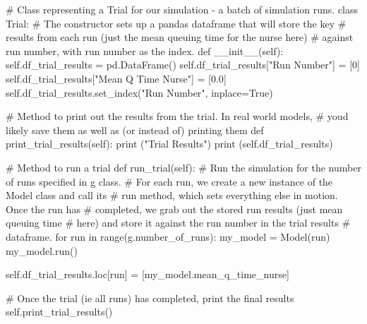 \documentclass[
  letterpaper,
  DIV=11,
  numbers=noendperiod]{scrreprt}
\newenvironment{Shaded}{}{}
\newcommand{\BuiltInTok}[1]{\textcolor[rgb]{0.84,0.23,0.29}{#1}}
\newcommand{\CommentTok}[1]{\textcolor[rgb]{0.42,0.45,0.49}{#1}}
\newcommand{\ControlFlowTok}[1]{\textcolor[rgb]{0.84,0.23,0.29}{#1}}
\newcommand{\DecValTok}[1]{\textcolor[rgb]{0.00,0.36,0.77}{#1}}
\newcommand{\FloatTok}[1]{\textcolor[rgb]{0.00,0.36,0.77}{#1}}
\newcommand{\FunctionTok}[1]{\textcolor[rgb]{0.44,0.26,0.76}{#1}}
\newcommand{\KeywordTok}[1]{\textcolor[rgb]{0.84,0.23,0.29}{#1}}
\newcommand{\NormalTok}[1]{\textcolor[rgb]{0.14,0.16,0.18}{#1}}
\newcommand{\OperatorTok}[1]{\textcolor[rgb]{0.14,0.16,0.18}{#1}}
\newcommand{\StringTok}[1]{\textcolor[rgb]{0.01,0.18,0.38}{#1}}
\newcommand{\VariableTok}[1]{\textcolor[rgb]{0.89,0.38,0.04}{#1}}
\begin{document}
\begin{Shaded}
\begin{Highlighting}[]
\CommentTok{\# Class representing a Trial for our simulation {-} a batch of simulation runs.}
\KeywordTok{class}\NormalTok{ Trial:}
    \CommentTok{\# The constructor sets up a pandas dataframe that will store the key}
    \CommentTok{\# results from each run (just the mean queuing time for the nurse here)}
    \CommentTok{\# against run number, with run number as the index.}
    \KeywordTok{def}  \FunctionTok{\_\_init\_\_}\NormalTok{(}\VariableTok{self}\NormalTok{):}
        \VariableTok{self}\NormalTok{.df\_trial\_results }\OperatorTok{=}\NormalTok{ pd.DataFrame()}
        \VariableTok{self}\NormalTok{.df\_trial\_results[}\StringTok{"Run Number"}\NormalTok{] }\OperatorTok{=}\NormalTok{ [}\DecValTok{0}\NormalTok{]}
        \VariableTok{self}\NormalTok{.df\_trial\_results[}\StringTok{"Mean Q Time Nurse"}\NormalTok{] }\OperatorTok{=}\NormalTok{ [}\FloatTok{0.0}\NormalTok{]}
        \VariableTok{self}\NormalTok{.df\_trial\_results.set\_index(}\StringTok{"Run Number"}\NormalTok{, inplace}\OperatorTok{=}\VariableTok{True}\NormalTok{)}

    \CommentTok{\# Method to print out the results from the trial.  In real world models,}
    \CommentTok{\# you\textquotesingle{}d likely save them as well as (or instead of) printing them}
    \KeywordTok{def}\NormalTok{ print\_trial\_results(}\VariableTok{self}\NormalTok{):}
        \BuiltInTok{print}\NormalTok{ (}\StringTok{"Trial Results"}\NormalTok{)}
        \BuiltInTok{print}\NormalTok{ (}\VariableTok{self}\NormalTok{.df\_trial\_results)}

    \CommentTok{\# Method to run a trial}
    \KeywordTok{def}\NormalTok{ run\_trial(}\VariableTok{self}\NormalTok{):}
        \CommentTok{\# Run the simulation for the number of runs specified in g class.}
        \CommentTok{\# For each run, we create a new instance of the Model class and call its}
        \CommentTok{\# run method, which sets everything else in motion.  Once the run has}
        \CommentTok{\# completed, we grab out the stored run results (just mean queuing time}
        \CommentTok{\# here) and store it against the run number in the trial results}
        \CommentTok{\# dataframe.}
        \ControlFlowTok{for}\NormalTok{ run }\KeywordTok{in} \BuiltInTok{range}\NormalTok{(g.number\_of\_runs):}
\NormalTok{            my\_model }\OperatorTok{=}\NormalTok{ Model(run)}
\NormalTok{            my\_model.run()}

            \VariableTok{self}\NormalTok{.df\_trial\_results.loc[run] }\OperatorTok{=}\NormalTok{ [my\_model.mean\_q\_time\_nurse]}

        \CommentTok{\# Once the trial (ie all runs) has completed, print the final results}
        \VariableTok{self}\NormalTok{.print\_trial\_results()}
\end{Highlighting}
\end{Shaded}
\end{document}
